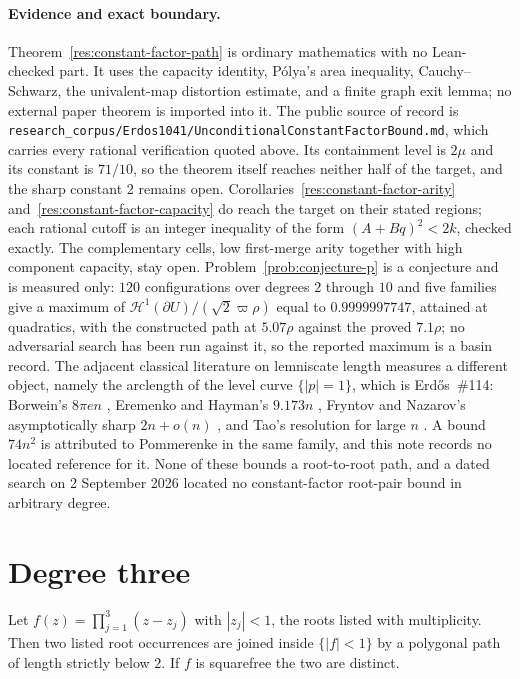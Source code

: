 \documentclass[11pt]{article}
\begin{document}
\paragraph{Evidence and exact boundary.}
\label{bdry:constant-factor}
Theorem~\ref{res:constant-factor-path} is ordinary mathematics with no
Lean-checked part.  It uses the capacity identity, P\'olya's area inequality,
Cauchy--Schwarz, the univalent-map distortion estimate, and a finite graph
exit lemma; no external paper theorem is imported into it.  The public source
of record is
\texttt{research\_corpus/Erdos1041/UnconditionalConstantFactorBound.md}, which
carries every rational verification quoted above.  Its
containment level is $2\mu$ and its constant is $71/10$, so the theorem itself
reaches neither half of the target, and the sharp constant $2$ remains open.
Corollaries~\ref{res:constant-factor-arity} and~\ref{res:constant-factor-capacity}
do reach the target on their stated regions; each rational cutoff is an integer
inequality of the form $(A+Bq)^2<2k$, checked exactly.  The complementary
cells, low first-merge arity together with high component capacity, stay open.
Problem~\ref{prob:conjecture-p} is a conjecture and is measured only: $120$
configurations over degrees $2$ through $10$ and five families give a maximum
of $\mathcal H^1(\partial U)/(\sqrt2\varpi\rho)$ equal to $0.9999997747$,
attained at quadratics, with the constructed path at $5.07\rho$ against the
proved $7.1\rho$; no adversarial search has been run against it, so the
reported maximum is a basin record.  The
adjacent classical literature on lemniscate length measures a different
object, namely the arclength of the level curve $\{|p|=1\}$, which is
Erd\H{o}s~\#114: Borwein's $8\pi en$
\cite{borwein1995}, Eremenko and Hayman's $9.173n$ \cite{eremenkohayman1999},
Fryntov and Nazarov's asymptotically sharp $2n+o(n)$ \cite{fryntovnazarov2008},
and Tao's resolution for large $n$ \cite{tao2025}.  A bound $74n^2$ is
attributed to Pommerenke in the same family, and this note records no located
reference for it.  None of these bounds a
root-to-root path, and a dated search on 2 September 2026 located no
constant-factor root-pair bound in arbitrary degree.

\section{Degree three}
\label{sec:degree-three}

\begin{theorem}
\label{res:degree-three}
Let $f(z)=\prod_{j=1}^{3}(z-z_j)$ with $|z_j|<1$, the roots listed with
multiplicity.  Then two listed root occurrences are joined inside
$\{|f|<1\}$ by a polygonal path of length strictly below $2$.  If $f$ is
squarefree the two are distinct.
\end{theorem}
\end{document}
